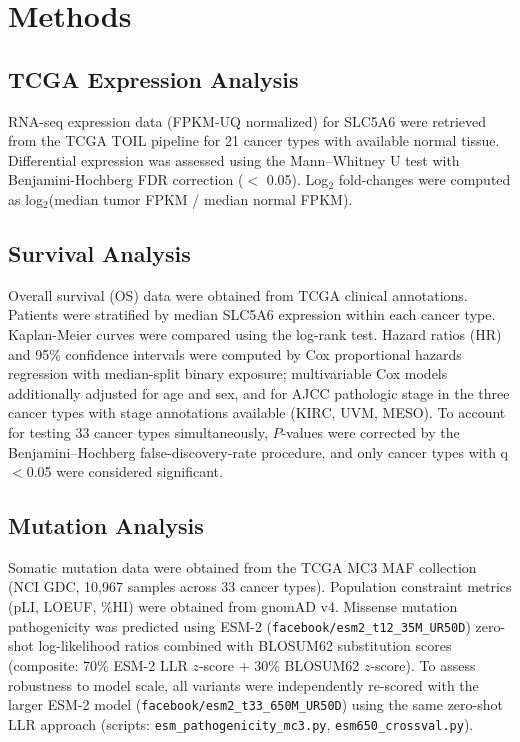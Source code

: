 \documentclass[pdflatex,sn-nature]{sn-jnl}
\begin{document}

\section*{Methods}

\subsection*{TCGA Expression Analysis}

RNA-seq expression data (FPKM-UQ normalized) for SLC5A6 were retrieved from the TCGA TOIL pipeline for 21 cancer types with available normal tissue. Differential expression was assessed using the Mann--Whitney U test with Benjamini-Hochberg FDR correction ($<$ 0.05). Log$_2$ fold-changes were computed as log$_2$(median tumor FPKM / median normal FPKM).

\subsection*{Survival Analysis}

Overall survival (OS) data were obtained from TCGA clinical annotations. Patients were stratified by median SLC5A6 expression within each cancer type. Kaplan-Meier curves were compared using the log-rank test. Hazard ratios (HR) and 95\% confidence intervals were computed by Cox proportional hazards regression with median-split binary exposure; multivariable Cox models additionally adjusted for age and sex, and for AJCC pathologic stage in the three cancer types with stage annotations available (KIRC, UVM, MESO). To account for testing 33 cancer types simultaneously, $P$-values were corrected by the Benjamini--Hochberg false-discovery-rate procedure, and only cancer types with q$<$0.05 were considered significant.

\subsection*{Mutation Analysis}

Somatic mutation data were obtained from the TCGA MC3 MAF collection (NCI GDC, 10,967 samples across 33 cancer types). Population constraint metrics (pLI, LOEUF, \%HI) were obtained from gnomAD v4. Missense mutation pathogenicity was predicted using ESM-2 (\nolinkurl{facebook/esm2_t12_35M_UR50D}) zero-shot log-likelihood ratios combined with BLOSUM62 substitution scores (composite: 70\% ESM-2 LLR $z$-score + 30\% BLOSUM62 $z$-score). To assess robustness to model scale, all variants were independently re-scored with the larger ESM-2 model (\nolinkurl{facebook/esm2_t33_650M_UR50D}) using the same zero-shot LLR approach (scripts: \texttt{esm\_pathogenicity\_mc3.py}, \texttt{esm650\_crossval.py}).
\end{document}
